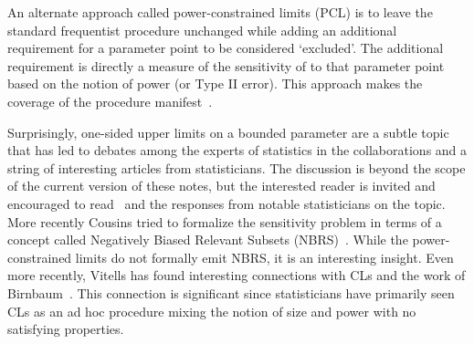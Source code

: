 An alternate approach called power-constrained limits (PCL) is to leave the standard frequentist procedure unchanged while adding an additional requirement for a parameter point to be considered `excluded'.  The additional requirement is directly a measure of the sensitivity of to that parameter point based on the notion of power (or Type II error).  This approach makes the coverage of the procedure manifest~\cite{2011arXiv1105.3166C}.


Surprisingly, one-sided upper limits on a bounded parameter are a subtle topic that has led to debates among the experts of statistics in the collaborations and a string of interesting articles from statisticians.  The discussion is beyond the scope of the current version of these notes, but the interested reader is invited and encouraged to read~\cite{Mandelkern2002} and the responses from notable statisticians on the topic.  More recently Cousins tried to formalize the sensitivity problem in terms of a concept called Negatively Biased Relevant Subsets (NBRS)~\cite{2011arXiv1109.2023C}.  While the power-constrained limits do not formally emit NBRS, it is an interesting insight.  Even more recently, Vitells has  found interesting connections with CLs and the work of Birnbaum~\cite{Birnbaum:1962,CLsWikipedia}. This connection is significant since statisticians have primarily seen CLs as an ad hoc procedure mixing the notion of size and power with no satisfying properties.
